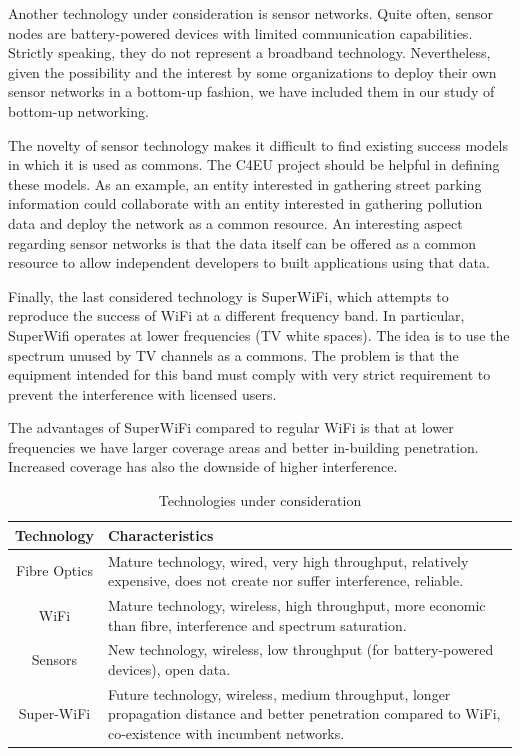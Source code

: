 \documentclass[conference]{IEEEtran}
\begin{document}
Another technology under consideration is sensor networks.
Quite often, sensor nodes are battery-powered devices with limited communication capabilities.
Strictly speaking, they do not represent a broadband technology.
Nevertheless, given the possibility and the interest by some organizations to deploy their own sensor networks in a bottom-up fashion, we have included them in our study of bottom-up networking.

The novelty of sensor technology makes it difficult to find existing success models in which it is used as commons.
The C4EU project should be helpful in defining these models.
As an example, an entity interested in gathering street parking information could collaborate with an entity interested in gathering pollution data and deploy the network as a common resource.
An interesting aspect regarding sensor networks is that the data itself can be offered as a common resource to allow independent developers to built applications using that data.

Finally, the last considered technology is SuperWiFi, which attempts to reproduce the success of WiFi at a different frequency band.
In particular, SuperWifi operates at lower frequencies (TV white spaces).
The idea is to use the spectrum unused by TV channels as a commons.
The problem is that the equipment intended for this band must comply with very strict requirement to prevent the interference with licensed users.

The advantages of SuperWiFi compared to regular WiFi is that at lower frequencies we have larger coverage areas and better in-building penetration.
Increased coverage has also the downside of higher interference.


\begin{table}[!t]
\renewcommand{\arraystretch}{1.3}
\caption{Technologies under consideration}
\label{tab:technologies}
\centering
\begin{tabular}{|c|p{5cm}|}
\hline
Technology & Characteristics \\
\hline
Fibre Optics & Mature technology, wired, very high throughput, relatively expensive, does not create nor suffer interference, reliable. \\
WiFi & Mature technology, wireless, high throughput, more economic than fibre, interference and spectrum saturation. \\
Sensors & New technology, wireless, low throughput (for battery-powered devices), open data. \\
Super-WiFi & Future technology, wireless, medium throughput, longer propagation distance and better penetration compared to WiFi, co-existence with incumbent networks.\\
\hline
\end{tabular}
\end{table}
\end{document}

